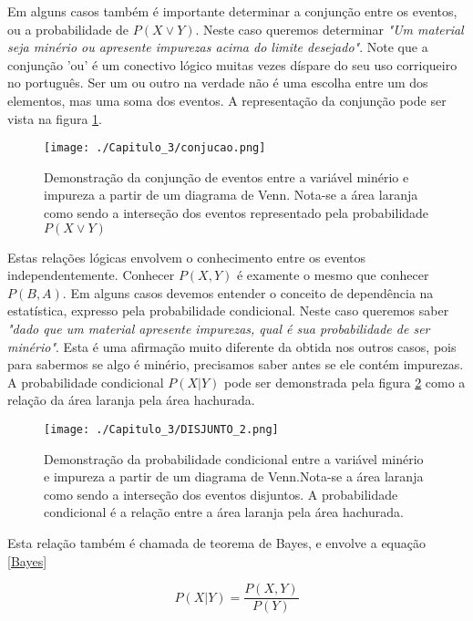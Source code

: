 Em alguns casos também é importante determinar a conjunção entre os eventos, ou a probabilidade de $P(X \vee Y)$. Neste caso queremos determinar \textit{"Um material seja minério ou apresente impurezas acima do limite desejado"}. Note que a conjunção 'ou' é um conectivo lógico muitas vezes díspare do seu uso corriqueiro no português. Ser um ou outro na verdade não é uma escolha entre um dos elementos, mas uma soma dos eventos. A representação da conjunção pode ser vista na figura \ref{conjuncao}.

\FloatBarrier
\begin{figure}[!htpb]
	\centering
	\texttt{[image: ./Capitulo\_3/conjucao.png]}	
	\caption{Demonstração da conjunção de eventos entre a variável minério e impureza a partir de um diagrama de Venn. Nota-se a área laranja como sendo a interseção dos eventos representado pela probabilidade $P(X\vee Y)$ }
	\label{conjuncao}
\end{figure}
\FloatBarrier

Estas relações lógicas envolvem o conhecimento entre os eventos independentemente. Conhecer $P(X,Y)$ é examente o mesmo que conhecer $P(B,A)$. Em alguns casos devemos entender o conceito de dependência na estatística, expresso pela probabilidade condicional. Neste caso queremos saber \textit{"dado que um material apresente impurezas, qual é sua probabilidade de ser minério"}. Esta é uma afirmação muito diferente da obtida nos outros casos, pois para sabermos se algo é minério, precisamos saber antes se ele contém impurezas. A probabilidade condicional $P(X|Y)$ pode ser demonstrada pela  figura \ref{disjuntos2} como a relação da área laranja pela área hachurada.

\FloatBarrier
\begin{figure}[!htpb]
	\centering
	\texttt{[image: ./Capitulo\_3/DISJUNTO\_2.png]}	
	\caption{Demonstração da probabilidade condicional entre a variável minério e impureza a partir de um diagrama de Venn.Nota-se a área laranja como sendo a interseção dos eventos disjuntos. A probabilidade condicional é a relação entre a área laranja pela área hachurada. }
	\label{disjuntos2}
\end{figure} 
\FloatBarrier

Esta relação também é chamada de teorema de Bayes, e envolve a equação \eqref{Bayes}

\begin{equation}\label{Bayes}
P(X|Y) = \frac{P(X,Y)}{P(Y)}
\end{equation}

